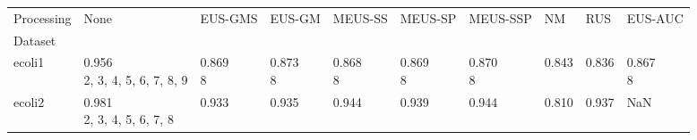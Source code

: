 \begin{tabular}{llllllllll}
\toprule
Processing &                                                     None &                                      EUS-GMS &                                 EUS-GM &                                MEUS-SS &                                         MEUS-SP &                                     MEUS-SSP &                                 NM &                                          RUS &                                EUS-AUC \\
Dataset                &                                                          &                                              &                                        &                                        &                                                 &                                              &                                    &                                              &                                        \\
\midrule
ecoli1                 &  \makecell{0.956 \\ \scriptsize{2, 3, 4, 5, 6, 7, 8, 9}} &           \makecell{0.869 \\ \scriptsize{8}} &     \makecell{0.873 \\ \scriptsize{8}} &     \makecell{0.868 \\ \scriptsize{8}} &              \makecell{0.869 \\ \scriptsize{8}} &           \makecell{0.870 \\ \scriptsize{8}} &  \makecell{0.843 \\ \scriptsize{}} &            \makecell{0.836 \\ \scriptsize{}} &     \makecell{0.867 \\ \scriptsize{8}} \\
ecoli2                 &     \makecell{0.981 \\ \scriptsize{2, 3, 4, 5, 6, 7, 8}} &            \makecell{0.933 \\ \scriptsize{}} &      \makecell{0.935 \\ \scriptsize{}} &      \makecell{0.944 \\ \scriptsize{}} &               \makecell{0.939 \\ \scriptsize{}} &            \makecell{0.944 \\ \scriptsize{}} &  \makecell{0.810 \\ \scriptsize{}} &            \makecell{0.937 \\ \scriptsize{}} &                                    NaN \\

\end{tabular}

